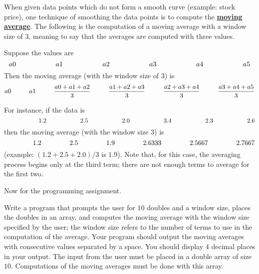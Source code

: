 When given data points which do not form a smooth curve (example: stock price),
one technique of smoothing the data points is to compute the
\underline{\bf moving average}. The following is the computation of a moving average
with a window size of $3$, meaning to say that the averages are computed with
three values.

Suppose the values are
\[
a0 \hspace{2 cm} a1 \hspace{2 cm} a2 \hspace{2 cm} a3 \hspace{2 cm} a4
\hspace{2 cm} a5
\]
Then the moving average (with the window size of $3$) is
\[
a0 \hspace{1 cm} a1 \hspace{1 cm} \frac{a0 + a1 + a2}{3} \hspace{1 cm}
\frac{a1 + a2 + a3}{3} \hspace{1 cm} \frac {a2 + a3 + a4}{3} \hspace{1 cm}
\frac{a3 + a4 + a5}{3}
\]

For instance, if the data is
\[
\hspace{2 cm} 1.2 \hspace{2 cm} 2.5 \hspace{2 cm} 2.0 \hspace{2 cm} 3.4
\hspace{2 cm} 2.3 \hspace{2 cm} 2.6
\]
then the moving average (with the window size $3$) is
\[
\hspace{1.5 cm} 1.2 \hspace{1.5 cm} 2.5 \hspace{1.5 cm} 1.9 \hspace{1.5 cm} 2.6333
\hspace{1.5 cm} 2.5667 \hspace{1.5 cm} 2.7667
\]
(example: $(1.2 + 2.5 + 2.0) / 3$ is $1.9$). Note that, for this case, the
averaging process begins only at the third term; there are not enough terms to
average for the first two.

Now for the programming assignment.

Write a program that prompts the user for $10$ doubles and a window size,
places the doubles in an array, and computes the moving average with the window
size specified by the user; the window size refers to the number of terms to
use in the computation of the average. Your program should output the moving
averages with consecutive values separated by a space. You should display $4$
decimal places in your output. The input from the user must be placed in a
double array of size $10$. Computations of the moving averages must be done
with this array.

